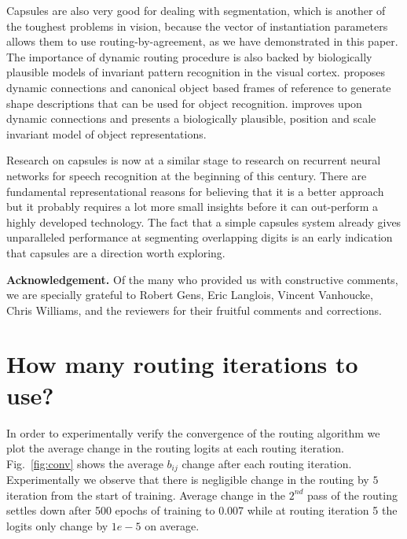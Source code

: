 \documentclass{article}
\begin{document}
Capsules are also very good for dealing with segmentation, which is another of the toughest problems in vision, because the vector of instantiation parameters allows them to use routing-by-agreement, as we have demonstrated in this paper. The importance of dynamic routing procedure is also backed by biologically plausible models of invariant pattern recognition in the visual cortex. \cite{hinton1981parallel} proposes dynamic connections and canonical object based frames of reference to generate shape descriptions that can be used for object recognition. \cite{olshausen1993neurobiological} improves upon \cite{hinton1981parallel} dynamic connections and presents a biologically plausible, position and scale invariant model of object representations. 

Research on capsules is now at a similar stage to research on recurrent neural networks for speech recognition at the beginning of this century. There are fundamental representational reasons for believing that it is a better approach but it probably requires a lot more small insights before it can out-perform a highly developed technology.  The fact that a simple capsules system already gives unparalleled performance at segmenting overlapping digits is an early indication that capsules are a direction worth exploring. 

{\bf Acknowledgement.} Of the many who provided us with constructive comments, we are specially grateful to Robert Gens, Eric Langlois, Vincent Vanhoucke, Chris Williams, and the reviewers for their fruitful comments and corrections.
\newpage




\appendix
\renewcommand\thefigure{\thesection.\arabic{figure}}   
\setcounter{figure}{0}  
\section{How many routing iterations to use?}

 In order to experimentally verify the convergence of the routing algorithm we plot the average change in the routing logits at each routing iteration. Fig.~\ref{fig:conv} shows the average $b_{ij}$ change after each routing iteration. Experimentally we observe that there is negligible change in the routing by $5$ iteration from the start of training. Average change in the $2^{nd}$ pass of the routing settles down after 500 epochs of training to 0.007 while at routing iteration 5 the logits only change by $1e-5$ on average.
\end{document}
